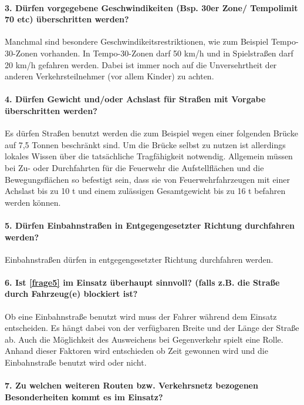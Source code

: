 \documentclass[12pt,a4paper]{article}
\begin{document}
\paragraph*{3. Dürfen vorgegebene Geschwindikeiten (Bsp. 30er Zone/ Tempolimit 70 etc) überschritten werden?}
\label{frage3}
Manchmal sind besondere Geschwindikeitsrestriktionen, wie zum Beispiel Tempo-30-Zonen vorhanden.  In Tempo-30-Zonen darf 50 km/h und in Spielstraßen darf 20 km/h gefahren werden. Dabei ist immer noch auf die Unversehrtheit der anderen Verkehrsteilnehmer (vor allem Kinder) zu achten.

\paragraph*{4. Dürfen Gewicht und/oder Achslast für Straßen mit Vorgabe überschritten werden?}
\label{frage4}

Es dürfen Straßen benutzt werden die zum Beispiel wegen einer folgenden Brücke auf 7,5 Tonnen beschränkt sind. Um die Brücke selbst zu nutzen ist allerdings lokales Wissen über die tatsächliche Tragfähigkeit notwendig. 
Allgemein müssen bei Zu- oder Durchfahrten für die Feuerwehr die Aufstellflächen und die Bewegungsflächen so befestigt sein, dass sie von Feuerwehrfahrzeugen mit einer Achslast bis zu 10 t und einem zulässigen Gesamtgewicht bis zu 16 t befahren werden können.

\paragraph*{5. Dürfen Einbahnstraßen in Entgegengesetzter Richtung durchfahren werden?}
\label{frage5}

Einbahnstraßen dürfen in entgegengesetzter Richtung durchfahren werden.

\paragraph*{6. Ist \ref{frage5} im Einsatz überhaupt sinnvoll? (falls z.B. die Straße durch Fahrzeug(e) blockiert ist?}
\label{frage6}

Ob eine Einbahnstraße benutzt wird muss der Fahrer während dem Einsatz entscheiden. Es hängt dabei von der verfügbaren Breite und der Länge der Straße ab. Auch die Möglichkeit des Ausweichens bei Gegenverkehr spielt eine Rolle. Anhand dieser Faktoren wird entschieden ob Zeit gewonnen wird und die Einbahnstraße benutzt wird oder nicht.

\paragraph*{7. Zu welchen weiteren Routen bzw. Verkehrsnetz bezogenen Besonderheiten kommt es im Einsatz?}
\label{frage7}
\end{document}
